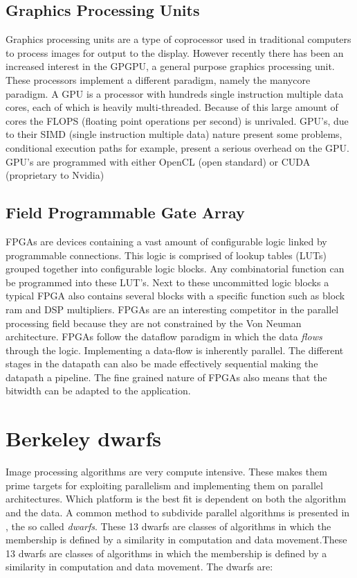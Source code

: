 \subsection{Graphics Processing Units} 
Graphics processing units are a type of coprocessor used in traditional computers to process images for output to the display. However recently there has been an increased interest in the GPGPU, a general purpose graphics processing unit. These processors implement a different paradigm, namely the manycore paradigm. A  GPU is a processor with hundreds single instruction multiple data cores, each of which is heavily multi-threaded. Because of this large amount of cores the FLOPS (floating point operations per second) is unrivaled\cite{kirk_programming_2010}. GPU's, due to their SIMD (single instruction multiple data) nature present some problems, conditional execution paths for example, present a serious overhead on the GPU. GPU's are programmed with either OpenCL (open standard) or CUDA (proprietary to Nvidia)

\subsection{Field Programmable Gate Array} 
FPGAs are devices containing a vast amount of configurable logic linked by programmable connections. This logic is comprised of lookup tables (LUTs) grouped together into configurable logic blocks. Any combinatorial function can be programmed into these LUT's. Next to these uncommitted logic blocks a typical FPGA also contains several blocks with a specific function such as block ram and DSP multipliers. FPGAs are an interesting competitor in the parallel processing field because they are not constrained by the Von Neuman architecture. FPGAs follow the dataflow paradigm in which the data \emph{flows} through the logic. Implementing a data-flow is inherently parallel. The different stages in the datapath can also be made effectively sequential making the datapath a pipeline. The fine grained nature of FPGAs also means that the bitwidth can be adapted to the application.


\section{Berkeley dwarfs }

Image processing algorithms are very compute intensive. These makes them prime targets for exploiting parallelism and implementing them on parallel architectures. Which platform is the best fit is dependent on both the algorithm and the data. A common method to subdivide parallel algorithms is presented in , the so called \emph{dwarfs}. These 13 dwarfs are classes of algorithms in which the membership is defined by a similarity in computation and data movement.These 13 dwarfs are classes of algorithms in which the membership is defined by a similarity in computation and data movement.
The dwarfs are:

